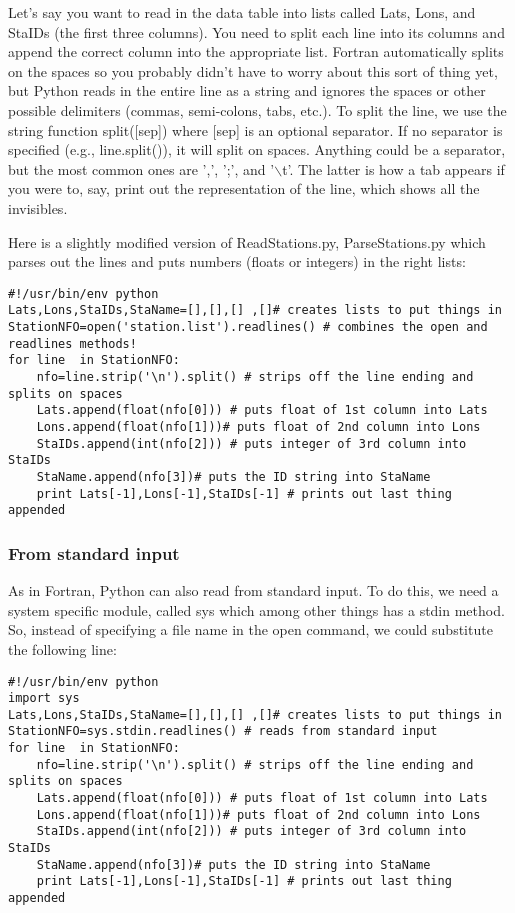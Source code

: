 {Let's say you want to read in the data table into lists called Lats, Lons, and StaIDs (the first three columns).  You need to split each line into its columns and append the correct column into the appropriate list.  Fortran automatically splits on the spaces so you probably didn't have to worry about this sort of thing yet, but Python reads in the entire line as a string and ignores the spaces or other possible delimiters (commas, semi-colons, tabs, etc.).  To split the line, we use the string function {\color{blue}split([sep])} where {\color{blue}[sep]} is an optional separator.  If no separator is specified (e.g., {\color{blue}line.split()}), it will split on spaces.   Anything could be a separator, but the most common ones are ',', ';', and '$\backslash$t'.  The latter is how a tab appears if you were to, say, print out the representation of the line, which shows all the invisibles.

Here is a slightly modified version of {\color{blue}ReadStations.py}, {\color{blue}ParseStations.py} which parses out the lines and puts numbers (floats or integers) in the right lists:

{\singlespacing \color{blue} \begin{verbatim}
#!/usr/bin/env python
Lats,Lons,StaIDs,StaName=[],[],[] ,[]# creates lists to put things in
StationNFO=open('station.list').readlines() # combines the open and readlines methods!
for line  in StationNFO:
    nfo=line.strip('\n').split() # strips off the line ending and splits on spaces
    Lats.append(float(nfo[0])) # puts float of 1st column into Lats
    Lons.append(float(nfo[1]))# puts float of 2nd column into Lons
    StaIDs.append(int(nfo[2])) # puts integer of 3rd column into StaIDs
    StaName.append(nfo[3])# puts the ID string into StaName
    print Lats[-1],Lons[-1],StaIDs[-1] # prints out last thing appended
\end{verbatim}}

 \subsubsection{From standard input}

As in Fortran, Python can also read from standard input.  To do this, we need a system specific module, called {\color{blue}sys} which among other things has a {\color{blue}stdin} method.  So, instead of specifying a file name in the {\color{blue}open} command, we could substitute the following line:


{\singlespacing \color{blue} \begin{verbatim}
#!/usr/bin/env python
import sys
Lats,Lons,StaIDs,StaName=[],[],[] ,[]# creates lists to put things in
StationNFO=sys.stdin.readlines() # reads from standard input
for line  in StationNFO:
    nfo=line.strip('\n').split() # strips off the line ending and splits on spaces
    Lats.append(float(nfo[0])) # puts float of 1st column into Lats
    Lons.append(float(nfo[1]))# puts float of 2nd column into Lons
    StaIDs.append(int(nfo[2])) # puts integer of 3rd column into StaIDs
    StaName.append(nfo[3])# puts the ID string into StaName
    print Lats[-1],Lons[-1],StaIDs[-1] # prints out last thing appended
\end{verbatim}}

}
